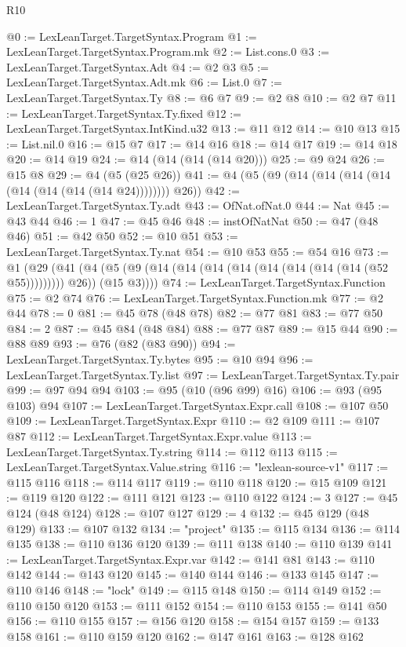\begin{lexlean}{R10}
\begin{coremodule}
{{{{{{{{{{{{{{{{{{{{{{{{{{{{{{{{{{{{{{{{{{{{{{{{{{{{{{{{{{{{{{{{{{{{{{{{{{{{{{{{{{{{@0 := LexLeanTarget.TargetSyntax.Program
@1 := LexLeanTarget.TargetSyntax.Program.mk
@2 := List.cons.{0}
@3 := LexLeanTarget.TargetSyntax.Adt
@4 := @2 @3
@5 := LexLeanTarget.TargetSyntax.Adt.mk
@6 := List.{0}
@7 := LexLeanTarget.TargetSyntax.Ty
@8 := @6 @7
@9 := @2 @8
@10 := @2 @7
@11 := LexLeanTarget.TargetSyntax.Ty.fixed
@12 := LexLeanTarget.TargetSyntax.IntKind.u32
@13 := @11 @12
@14 := @10 @13
@15 := List.nil.{0}
@16 := @15 @7
@17 := @14 @16
@18 := @14 @17
@19 := @14 @18
@20 := @14 @19
@24 := @14 (@14 (@14 (@14 @20)))
@25 := @9 @24
@26 := @15 @8
@29 := @4 (@5 (@25 @26))
@41 := @4 (@5 (@9 (@14 (@14 (@14 (@14 (@14 (@14 (@14 (@14 @24)))))))) @26))
@42 := LexLeanTarget.TargetSyntax.Ty.adt
@43 := OfNat.ofNat.{0}
@44 := Nat
@45 := @43 @44
@46 := 1
@47 := @45 @46
@48 := instOfNatNat
@50 := @47 (@48 @46)
@51 := @42 @50
@52 := @10 @51
@53 := LexLeanTarget.TargetSyntax.Ty.nat
@54 := @10 @53
@55 := @54 @16
@73 := @1
    (@29
      (@41 (@4 (@5 (@9 (@14 (@14 (@14 (@14 (@14 (@14 (@14 (@14 (@52 @55))))))))) @26)) (@15 @3))))
@74 := LexLeanTarget.TargetSyntax.Function
@75 := @2 @74
@76 := LexLeanTarget.TargetSyntax.Function.mk
@77 := @2 @44
@78 := 0
@81 := @45 @78 (@48 @78)
@82 := @77 @81
@83 := @77 @50
@84 := 2
@87 := @45 @84 (@48 @84)
@88 := @77 @87
@89 := @15 @44
@90 := @88 @89
@93 := @76 (@82 (@83 @90))
@94 := LexLeanTarget.TargetSyntax.Ty.bytes
@95 := @10 @94
@96 := LexLeanTarget.TargetSyntax.Ty.list
@97 := LexLeanTarget.TargetSyntax.Ty.pair
@99 := @97 @94 @94
@103 := @95 (@10 (@96 @99) @16)
@106 := @93 (@95 @103) @94
@107 := LexLeanTarget.TargetSyntax.Expr.call
@108 := @107 @50
@109 := LexLeanTarget.TargetSyntax.Expr
@110 := @2 @109
@111 := @107 @87
@112 := LexLeanTarget.TargetSyntax.Expr.value
@113 := LexLeanTarget.TargetSyntax.Ty.string
@114 := @112 @113
@115 := LexLeanTarget.TargetSyntax.Value.string
@116 := "lexlean-source-v1"
@117 := @115 @116
@118 := @114 @117
@119 := @110 @118
@120 := @15 @109
@121 := @119 @120
@122 := @111 @121
@123 := @110 @122
@124 := 3
@127 := @45 @124 (@48 @124)
@128 := @107 @127
@129 := 4
@132 := @45 @129 (@48 @129)
@133 := @107 @132
@134 := "project"
@135 := @115 @134
@136 := @114 @135
@138 := @110 @136 @120
@139 := @111 @138
@140 := @110 @139
@141 := LexLeanTarget.TargetSyntax.Expr.var
@142 := @141 @81
@143 := @110 @142
@144 := @143 @120
@145 := @140 @144
@146 := @133 @145
@147 := @110 @146
@148 := "lock"
@149 := @115 @148
@150 := @114 @149
@152 := @110 @150 @120
@153 := @111 @152
@154 := @110 @153
@155 := @141 @50
@156 := @110 @155
@157 := @156 @120
@158 := @154 @157
@159 := @133 @158
@161 := @110 @159 @120
@162 := @147 @161
@163 := @128 @162
}}}}}}}}}}}}}}}}}}}}}}}}}}}}}}}}}}}}}}}}}}}}}}}}}}}}}}}}}}}}}}}}}}}}}}}}}}}}}}}}}}}}
\end{coremodule}
\end{lexlean}
